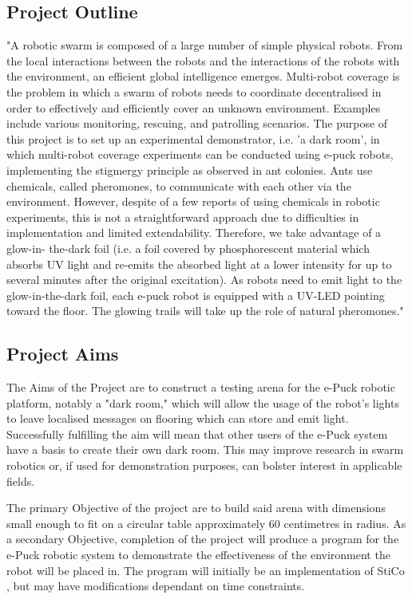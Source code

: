 \subsection{Project Outline} \label{desProOut}
"A robotic swarm is composed of a large number of simple physical robots. From
the local interactions between the robots and the interactions of the robots
with the environment, an efficient global intelligence emerges. Multi-robot
coverage is the problem in which a swarm of robots needs to coordinate
decentralised in order to effectively and efficiently cover an unknown
environment. Examples include various monitoring, rescuing, and patrolling
scenarios. The purpose of this project is to set up an experimental
demonstrator, i.e. 'a dark room', in which multi-robot coverage experiments can
be conducted using e-puck robots, implementing the stigmergy principle as
observed in ant colonies. Ants use chemicals, called pheromones, to communicate
with each other via the environment. However, despite of a few reports of using
chemicals in robotic experiments, this is not a straightforward approach due to
difficulties in implementation and limited extendability. Therefore, we take
advantage of a glow-in- the-dark foil (i.e. a foil covered by phosphorescent
material which absorbs UV light and re-emits the absorbed light at a lower
intensity for up to several minutes after the original excitation). As robots
need to emit light to the glow-in-the-dark foil, each e-puck robot is equipped
with a UV-LED pointing toward the floor. The glowing trails will take up the
role of natural pheromones."

\subsection{Project Aims} \label{desProAim}
The Aims of the Project are to construct a testing arena for the e-Puck robotic 
platform, notably a "dark room," which will allow the usage of the robot's
lights to leave localised messages on flooring which can store and emit light.
Successfully fulfilling the aim will mean that other users of the e-Puck system
have a basis to create their own dark room.  This may improve research in swarm
robotics or, if used for demonstration purposes, can bolster interest in
applicable fields.

The primary Objective of the project are to build said arena with dimensions
small enough to fit on a circular table approximately 60 centimetres in radius.
As a secondary Objective, completion of the project will produce a program for
the e-Puck robotic system to demonstrate the effectiveness of the environment 
the robot will be placed in.  The program will initially be an implementation of
StiCo \cite{Ranjbar-Sahraei2012Demo}, but may have modifications dependant on
time constraints.

